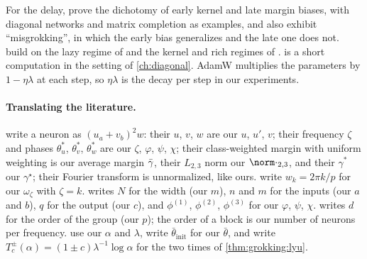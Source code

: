 \begin{refsection}
For the delay, \textcite{LyuEtAl2024} prove the dichotomy of early kernel and late margin biases, with diagonal networks and matrix completion as examples, and also exhibit ``misgrokking'', in which the early bias generalizes and the late one does not. \Textcite{KumarEtAl2024} build on the lazy regime of \textcite{ChizatEtAl2019} and the kernel and rich regimes of \textcite{WoodworthEtAl2020}.  is a short computation in the setting of \cref{ch:diagonal}. AdamW \parencite{LoshchilovHutter2019} multiplies the parameters by $1-\eta\lambda$ at each step, so $\eta\lambda$ is the decay per step in our experiments.

\paragraph{Translating the literature.} \Textcite{MorwaniEtAl2024} write a neuron as $(u_a+v_b)^2w$: their $u$, $v$, $w$ are our $u$, $u'$, $v$; their frequency $\zeta$ and phases $\theta^*_u$, $\theta^*_v$, $\theta^*_w$ are our $\zeta$, $\varphi$, $\psi$, $\chi$; their class-weighted margin with uniform weighting is our average margin $\bar\gamma$, their $L_{2,3}$ norm our $\norm\cdot_{2,3}$, and their $\gamma^*$ our $\gamma^\star$; their Fourier transform is unnormalized, like ours. \Textcite{NandaEtAl2023} write $w_k=2\pi k/p$ for our $\omega_\zeta$ with $\zeta=k$. \Textcite{Gromov2023} writes $N$ for the width (our $m$), $n$ and $m$ for the inputs (our $a$ and $b$), $q$ for the output (our $c$), and $\phi^{(1)}$, $\phi^{(2)}$, $\phi^{(3)}$ for our $\varphi$, $\psi$, $\chi$. \Textcite{Tian2025} writes $d$ for the order of the group (our $p$); the order of a block is our number of neurons per frequency. \Textcite{LyuEtAl2024} use our $\alpha$ and $\lambda$, write $\bar\theta_{\mathrm{init}}$ for our $\bar\theta$, and write $T^\pm_c(\alpha)=(1\pm c)\lambda^{-1}\log\alpha$ for the two times of \cref{thm:grokking:lyu}.

\printchapterbib
\end{refsection}

